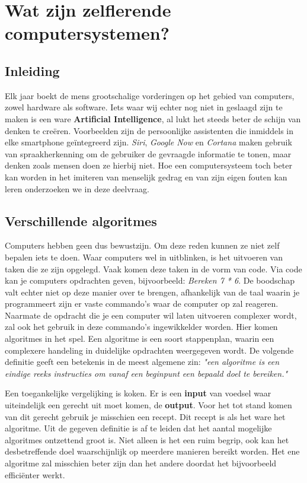
\section{Wat zijn zelflerende computersystemen?}

\subsection{Inleiding}
Elk jaar boekt de mens grootschalige vorderingen op het gebied van computers, zowel hardware als software. Iets waar wij echter nog niet in geslaagd zijn te maken is een ware \textbf{ Artificial Intelligence}, al lukt het steeds beter de schijn van denken te cre\"eren. Voorbeelden zijn de persoonlijke assistenten die inmiddels in elke smartphone geïntegreerd zijn. \textit{Siri}, \textit{Google Now} en \textit{Cortana} maken gebruik van spraakherkenning om de gebruiker de gevraagde informatie te tonen, maar denken zoals mensen doen ze hierbij niet. Hoe een computersysteem toch beter kan worden in het imiteren van menselijk gedrag en van zijn eigen fouten kan leren onderzoeken we in deze deelvraag.


\subsection{Verschillende algoritmes}
Computers hebben geen dus bewustzijn. Om deze reden kunnen ze niet zelf bepalen iets te doen. Waar computers wel in uitblinken, is het uitvoeren van taken die ze zijn opgelegd. Vaak komen deze taken in de vorm van code. Via code kan je computers opdrachten geven, bijvoorbeeld: \textit{Bereken 7 * 6}. De boodschap valt echter niet op deze manier over te brengen, afhankelijk van de taal waarin je programmeert zijn er vaste commando's waar de computer op zal reageren.
Naarmate de opdracht die je een computer wil laten uitvoeren complexer wordt, zal ook het gebruik in deze commando's ingewikkelder worden. Hier komen algoritmes in het spel. Een algoritme is een soort stappenplan, waarin een complexere handeling in duidelijke opdrachten weergegeven wordt. De volgende definitie geeft een betekenis in de meest algemene zin: \textit{"een algoritme is een eindige reeks instructies om vanaf een beginpunt een bepaald doel te bereiken."} \cite{WoordenOrg}

Een toegankelijke vergelijking is koken. Er is een \textbf{input} van voedsel waar uiteindelijk een gerecht uit moet komen, de \textbf{output}. Voor het tot stand komen van dit gerecht gebruik je misschien een recept. Dit recept is als het ware het algoritme.
Uit de gegeven definitie is af te leiden dat het aantal mogelijke algoritmes ontzettend groot is. Niet alleen is het een ruim begrip, ook kan het desbetreffende doel waarschijnlijk op meerdere manieren bereikt worden. Het ene algoritme zal misschien beter zijn dan het andere doordat het bijvoorbeeld effici\"enter werkt.

